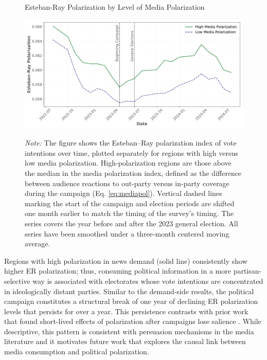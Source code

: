 \documentclass[12pt]{article}
\begin{document}
	\begin{figure}[!htb]

		\centering
		\caption{Esteban-Ray Polarization by Level of Media Polarization}
		\includegraphics[width=150mm]{figures/er_polarization_stata_group_correct}
				\label{fig:er1}
		\caption*{\small  \textit{Note:} The figure shows the Esteban–Ray polarization index of vote intentions over time, plotted separately for regions with high versus low media polarization. High-polarization regions are those above the median in the media polarization index, defined as the difference between audience reactions to out-party versus in-party coverage during the campaign (Eq. \ref{eq:mediapol}). Vertical dashed lines marking the start of the campaign and election periods are shifted one month earlier to match the timing of the survey's timing.  The series covers the year before and after the 2023 general election. All series have been smoothed under a three-month centered moving average.}
		
	\end{figure}
	
	
	
Regions with high polarization in news demand (solid line) consistently show higher ER polarization; thus, consuming political information in a more partisan-selective way is associated with electorates whose vote intentions are concentrated in ideologically distant parties. Similar  to  the demand‑side results, the political campaign constitutes a structural break of one year of declining ER polarization levels  that persists for over a year. This persistence contrasts with prior work that found short-lived effects of polarization after campaigns lose salience \citep{Hernndez2020AffectivePA}. While descriptive, this pattern is consistent with persuasion mechanisms in the media literature and it motivates future work that explores the causal link between media consumption and political polarization.
	
\end{document}

